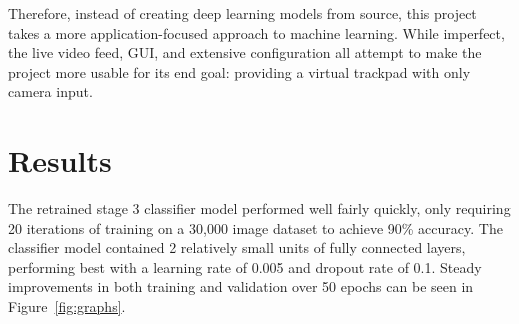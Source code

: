 \documentclass{article}
\begin{document}
Therefore, instead of creating deep learning models from source, this project takes a more application-focused approach to machine learning. While imperfect, the live video feed, GUI, and extensive configuration all attempt to make the project more usable for its end goal: providing a virtual trackpad with only camera input.


\section{Results}
The retrained stage 3 classifier model performed well fairly quickly, only requiring 20 iterations of training on a 30,000 image dataset \cite{Alexander_2024} to achieve 90\% accuracy. The classifier model contained 2 relatively small units of fully connected layers, performing best with a learning rate of 0.005 and dropout rate of 0.1. Steady improvements in both training and validation over 50 epochs can be seen in Figure~\ref{fig:graphs}.
\end{document}
